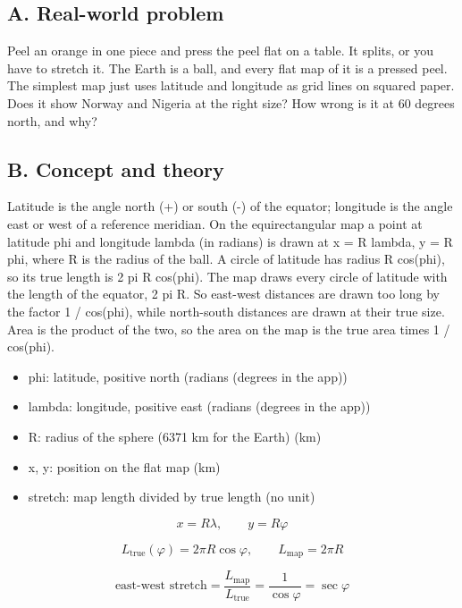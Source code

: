 \documentclass[11pt,a4paper]{article}
\begin{document}
\subsection*{A. Real-world problem}
Peel an orange in one piece and press the peel flat on a table. It splits, or you have to stretch it. The Earth is a ball, and every flat map of it is a pressed peel. The simplest map just uses latitude and longitude as grid lines on squared paper. Does it show Norway and Nigeria at the right size? How wrong is it at 60 degrees north, and why?

\subsection*{B. Concept and theory}
Latitude is the angle north (+) or south (-) of the equator; longitude is the angle east or west of a reference meridian. On the equirectangular map a point at latitude phi and longitude lambda (in radians) is drawn at x = R lambda, y = R phi, where R is the radius of the ball. A circle of latitude has radius R cos(phi), so its true length is 2 pi R cos(phi). The map draws every circle of latitude with the length of the equator, 2 pi R. So east-west distances are drawn too long by the factor 1 / cos(phi), while north-south distances are drawn at their true size. Area is the product of the two, so the area on the map is the true area times 1 / cos(phi).

\begin{itemize}[nosep]
\item phi: latitude, positive north (radians (degrees in the app))
\item lambda: longitude, positive east (radians (degrees in the app))
\item R: radius of the sphere (6371 km for the Earth) (km)
\item x, y: position on the flat map (km)
\item stretch: map length divided by true length (no unit)
\end{itemize}

\begin{equation*}
x = R\lambda,\qquad y = R\varphi
\end{equation*}

\begin{equation*}
L_{\text{true}}(\varphi)=2\pi R\cos\varphi,\qquad L_{\text{map}}=2\pi R
\end{equation*}

\begin{equation*}
\text{east-west stretch}=\frac{L_{\text{map}}}{L_{\text{true}}}=\frac{1}{\cos\varphi}=\sec\varphi
\end{equation*}
\end{document}
